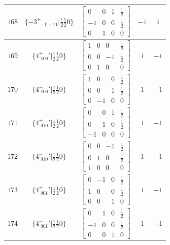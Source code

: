 \documentclass[fleqn,8pt]{jsarticle}
\begin{document}
\begin{longtable}{ccccc}
$ 168 $ & $ \{-3^{+}_{\,\,-1-11}|\frac{1}{2} \frac{1}{2} 0\} $ & $ \begin{bmatrix} 0 & 0 & 1 & \frac{1}{2} \\ -1 & 0 & 0 & \frac{1}{2} \\ 0 & 1 & 0 & 0 \end{bmatrix} $ & $ -1 $ & $ 1 $ \\ \hline
$ 169 $ & $ \{4^{+}_{\,\,100}{}'|\frac{1}{2} \frac{1}{2} 0\} $ & $ \begin{bmatrix} 1 & 0 & 0 & \frac{1}{2} \\ 0 & 0 & -1 & \frac{1}{2} \\ 0 & 1 & 0 & 0 \end{bmatrix} $ & $ 1 $ & $ -1 $ \\ \hline
$ 170 $ & $ \{4^{-}_{\,\,100}{}'|\frac{1}{2} \frac{1}{2} 0\} $ & $ \begin{bmatrix} 1 & 0 & 0 & \frac{1}{2} \\ 0 & 0 & 1 & \frac{1}{2} \\ 0 & -1 & 0 & 0 \end{bmatrix} $ & $ 1 $ & $ -1 $ \\ \hline
$ 171 $ & $ \{4^{+}_{\,\,010}{}'|\frac{1}{2} \frac{1}{2} 0\} $ & $ \begin{bmatrix} 0 & 0 & 1 & \frac{1}{2} \\ 0 & 1 & 0 & \frac{1}{2} \\ -1 & 0 & 0 & 0 \end{bmatrix} $ & $ 1 $ & $ -1 $ \\ \hline
$ 172 $ & $ \{4^{-}_{\,\,010}{}'|\frac{1}{2} \frac{1}{2} 0\} $ & $ \begin{bmatrix} 0 & 0 & -1 & \frac{1}{2} \\ 0 & 1 & 0 & \frac{1}{2} \\ 1 & 0 & 0 & 0 \end{bmatrix} $ & $ 1 $ & $ -1 $ \\ \hline
$ 173 $ & $ \{4^{+}_{\,\,001}{}'|\frac{1}{2} \frac{1}{2} 0\} $ & $ \begin{bmatrix} 0 & -1 & 0 & \frac{1}{2} \\ 1 & 0 & 0 & \frac{1}{2} \\ 0 & 0 & 1 & 0 \end{bmatrix} $ & $ 1 $ & $ -1 $ \\ \hline
$ 174 $ & $ \{4^{-}_{\,\,001}{}'|\frac{1}{2} \frac{1}{2} 0\} $ & $ \begin{bmatrix} 0 & 1 & 0 & \frac{1}{2} \\ -1 & 0 & 0 & \frac{1}{2} \\ 0 & 0 & 1 & 0 \end{bmatrix} $ & $ 1 $ & $ -1 $ \\ \hline

\end{longtable}
\end{document}

